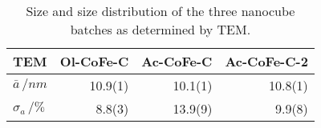 \documentclass[\main/dresen_thesis.tex]{subfiles}
\begin{document}
  \begin{table}[ht]
    \centering
    \caption{\label{tab:monolayers:nanoparticles:discussion:tem}Size and size distribution of the three nanocube batches as determined by TEM.}
    \begin{tabular}{ l | r | r | r }
      \textbf{TEM} & \textbf{Ol-CoFe-C} & \textbf{Ac-CoFe-C} & \textbf{Ac-CoFe-C-2}\\
      \hline
      $\bar{a} \, / \unit{nm}$    & 10.9(1) & 10.1(1) & 10.8(1)\\
      $\sigma_{a}\, / \unit{\%}$  & 8.8(3)  & 13.9(9) & 9.9(8)\\
      \hline
    \end{tabular}
  \end{table}
\end{document}
